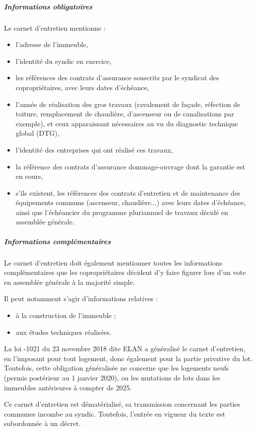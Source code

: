 			\subparagraph{Informations obligatoires}
			Le carnet d'entretien mentionne :
			\begin{itemize}
				\item l'adresse de l'immeuble,
				\item l'identité du syndic en exercice,
				\item les références des contrats d'assurance souscrits par le syndicat des copropriétaires, avec leurs
				dates d'échéance,
				\item l'année de réalisation des gros travaux (ravalement de façade, réfection de toiture, remplacement
				de chaudière, d'ascenseur ou de canalisations par exemple), et ceux apparaissant nécessaires au
				vu du diagnostic technique global (DTG),
				\item l'identité des entreprises qui ont réalisé ces travaux,
				\item la référence des contrats d'assurance dommage-ouvrage dont la garantie est en cours,
				\item s'ils existent, les références des contrats d'entretien et de maintenance des équipements
				communs (ascenseur, chaudière...) avec leurs dates d'échéance, ainsi que l’échéancier du
				programme pluriannuel de travaux décidé en assemblée générale.
			\end{itemize}
				
			\subparagraph{Informations complémentaires}
			
			\par Le carnet d'entretien doit également mentionner toutes les informations complémentaires que
			les copropriétaires décident d'y faire figurer lors d'un vote en assemblée générale à la majorité
			simple.

			Il peut notamment s'agir d'informations relatives :
			\begin{itemize}
				\item à la construction de l'immeuble ;
				\item aux études techniques réalisées.
			\end{itemize}
		
			La loi -1021 du 23 novembre 2018 dite ELAN a généralisé le carnet d’entretien, en l’imposant pour
			tout logement, donc également pour la partie privative du lot. Toutefois, cette obligation généralisée ne
			concerne que les logements neufs (permis postérieur au 1\ier{} janvier 2020), ou les mutations de lots dans
			les immeubles antérieures à compter de 2025.
			
			Ce carnet d’entretien est dématérialisé, sa transmission concernant les parties communes incombe au
			syndic. Toutefois, l’entrée en vigueur du texte est subordonnée à un décret.
			
